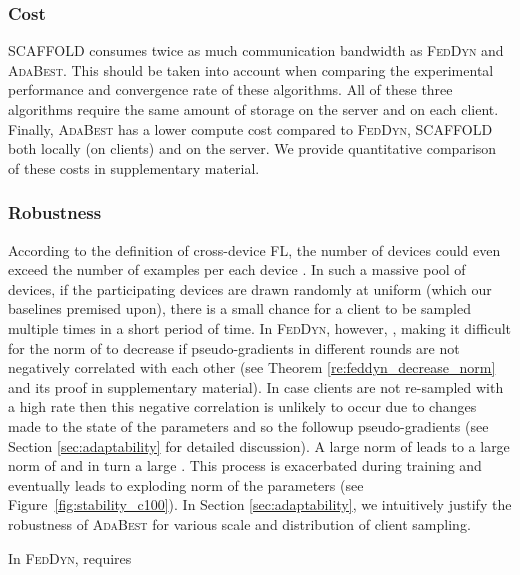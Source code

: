\documentclass[runningheads]{llncs}
\def\figref#1{Figure~\ref{#1}}
\newcommand{\scaffold}{\textsc{SCAFFOLD}\xspace}
\newcommand{\feddyn}{\textsc{FedDyn}\xspace}
\newcommand{\ours}{\textsc{AdaBest}\xspace}
\begin{document}
\subsubsection{Cost}
\scaffold consumes twice as much communication bandwidth as \feddyn and \ours. This should be taken into account when comparing the experimental performance and convergence rate of these algorithms. All of these three algorithms require the same amount of storage on the server and on each client. Finally, \ours has a lower compute cost compared to \feddyn, \scaffold both locally (on clients) and on the server. We provide quantitative comparison of these costs in supplementary material.

\subsubsection{Robustness}
According to the definition of cross-device FL, the number of devices could even exceed the number of examples per each device \cite{mcmahan2017communication}. In such a massive pool of devices, if the participating devices are drawn randomly at uniform (which our baselines premised upon), there is a small chance for a client to be sampled multiple times in a short period of time. In \feddyn, however, , making it difficult for the norm of  to decrease if pseudo-gradients in different rounds are not negatively correlated with each other (see Theorem \ref{re:feddyn_decrease_norm} and its proof in supplementary material). In case clients are not re-sampled with a high rate then this negative correlation is unlikely to occur due to changes made to the state of the parameters and so the followup pseudo-gradients (see Section \ref{sec:adaptability} for detailed discussion). A large norm of  leads to a large norm of  and in turn a large . This process is exacerbated during training and eventually leads to exploding norm of the parameters (see \figref{fig:stability_c100}). 
In Section \ref{sec:adaptability}, we intuitively justify the robustness of \ours for various scale and distribution of client sampling.

\begin{theorem}
\label{re:feddyn_decrease_norm}
In \feddyn,  requires


\end{theorem}
\end{document}
